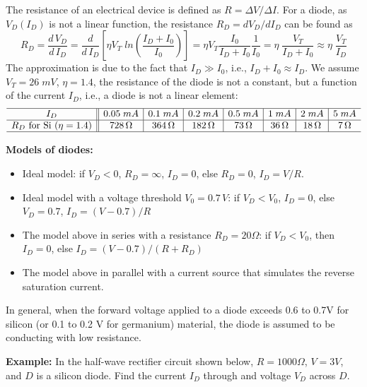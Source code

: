 \documentclass{article}
\begin{document}
The resistance of an electrical device is defined as $R=\Delta V/\Delta I$.
For a diode, as $V_D(I_D)$ is not a linear function, the resistance 
$R_D=dV_D/dI_D$ can be found as
\begin{equation}
R_D=\frac{d\,V_D}{d\,I_D}=\frac{d}{d\,I_D} \left[\eta V_T\;ln \left(\frac{I_D+I_0}{I_0}\right) \right]
=\eta V_T \frac{I_0}{I_D+I_0}\frac{1}{I_0}=\eta \; \frac{V_T}{I_D+I_0}
\approx \eta \; \frac{V_T}{I_D}	
\end{equation}
The approximation is due to the fact that $I_D \gg I_0$, i.e., 
$I_D+I_0\approx I_D$. We assume $V_T=26\;mV$, $\eta=1.4$, the resistance
of the diode is not a constant, but a function of the current $I_D$, i.e., 
a diode is not a linear element:
\begin{equation}
\begin{array}{c||c|c|c|c|c|c|c} \hline
I_D	& 0.05\; mA & 0.1\; mA & 0.2 \;mA & 0.5\; mA & 1\; mA & 2\; mA & 5\; mA \\ \hline
R_D \mbox{ for Si } (\eta=1.4) & 728\,\Omega & 364\,\Omega & 182\,\Omega & 
  73\,\Omega & 36\,\Omega & 18\,\Omega & 7\,\Omega\\\hline
\end{array}
\end{equation}


{\bf Models of diodes:}


\begin{itemize}
\item Ideal model: 
  if $V_D<0$, $R_D=\infty$, $I_D=0$, else $R_D=0$, $I_D=V/R$.
\item Ideal model with a voltage threshold $V_0=0.7\,V$:
  if $V_D<V_0$, $I_D=0$, else $V_D=0.7$, $I_D=(V-0.7)/R$
\item The model above in series with a resistance $R_D=20\Omega$:
  if $V_D<V_0$, then $I_D=0$, else $I_D=(V-0.7)/(R+R_D)$
\item The model above in parallel with a current source that simulates
  the reverse saturation current.
\end{itemize}


In general, when the forward voltage applied to a diode exceeds 0.6 to 
0.7V for silicon (or 0.1 to 0.2 V for germanium) material, the diode is 
assumed to be conducting with low resistance.

{\bf Example: } In the half-wave rectifier circuit shown below, 
$R=1000\Omega$, $V=3V$, and $D$ is a silicon diode. Find the current
$I_D$ through and voltage $V_D$ across $D$.
\end{document}
